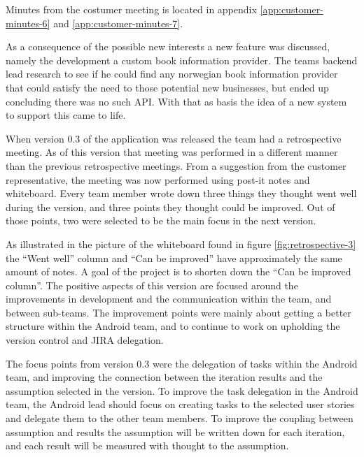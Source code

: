 Minutes from the costumer meeting is located in appendix \ref{app:customer-minutes-6} and \ref{app:customer-minutes-7}.

As a consequence of the possible new interests a new feature was discussed, namely the development a custom book information provider. The teams \gls{backend} lead research to see if he could find any norwegian book information provider that could satisfy the need to those potential new businesses, but ended up concluding there was no such API. With that as basis the idea of a new system to support this came to life. 

When version 0.3 of the application was released the team had a retrospective meeting. As of this version that meeting was performed in a different manner than the previous retrospective meetings. From a suggestion from the customer representative, the meeting was now performed using post-it notes and whiteboard. Every team member wrote down three things they thought went well during the version, and three points they thought could be improved. Out of those points, two were selected to be the main focus in the next version. 

As illustrated in the picture of the whiteboard found in figure \ref{fig:retrospective-3} the “Went well” column and “Can be improved” have approximately the same amount of notes. A goal of the project is to shorten down the “Can be improved column”. The positive aspects of this version are focused around the improvements in development and the communication within the team, and between sub-teams. The improvement points were mainly about getting a better structure within the Android team, and to continue to work on upholding the version control and JIRA delegation. 

The focus points from version 0.3 were the delegation of tasks within the Android team, and improving the connection between the iteration results and the assumption selected in the version. To improve the task delegation in the Android team, the Android lead should focus on creating tasks to the selected user stories and delegate them to the other team members. To improve the coupling between assumption and results the assumption will be written down for each iteration, and each result will be measured with thought to the assumption.

